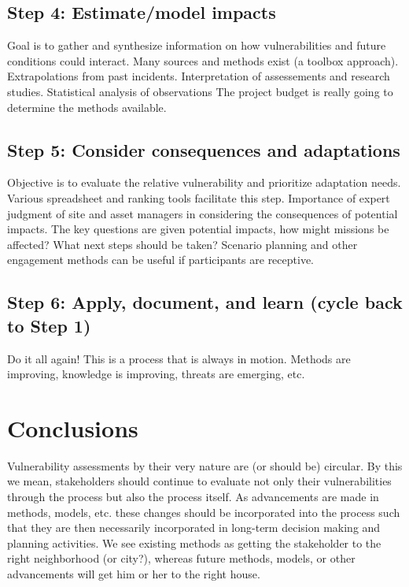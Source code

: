 \documentclass[10pt]{amsart}
\begin{document}
\subsection{Step 4: Estimate/model impacts}
Goal is to gather and synthesize information on how vulnerabilities and future conditions could interact.
Many sources and methods exist (a toolbox approach).
Extrapolations from past incidents.
Interpretation of assessements and research studies.
Statistical analysis of observations
The project budget is really going to determine the methods available.
 
\subsection{Step 5: Consider consequences and adaptations}
Objective is to evaluate the relative vulnerability and prioritize adaptation needs.
Various spreadsheet and ranking tools facilitate this step.
Importance of expert judgment of site and asset managers in considering the consequences of potential impacts.
The key questions are given potential impacts, how might missions be affected?
What next steps should be taken?
Scenario planning and other engagement methods can be useful if participants are receptive.

\subsection{Step 6: Apply, document, and learn (cycle back to Step 1)}
Do it all again!
This is a process that is always in motion.
Methods are improving, knowledge is improving, threats are emerging, etc.



\section{Conclusions}
Vulnerability assessments by their very nature are (or should be) circular.
By this we mean, stakeholders should continue to evaluate not only their vulnerabilities through the process but also the process itself.
As advancements are made in methods, models, etc. these changes should be incorporated into the process such that they are then necessarily incorporated in long-term decision making and planning activities. 
We see existing methods as getting the stakeholder to the right neighborhood (or city?), whereas future methods, models, or other advancements will get him or her to the right house. 
\end{document}
